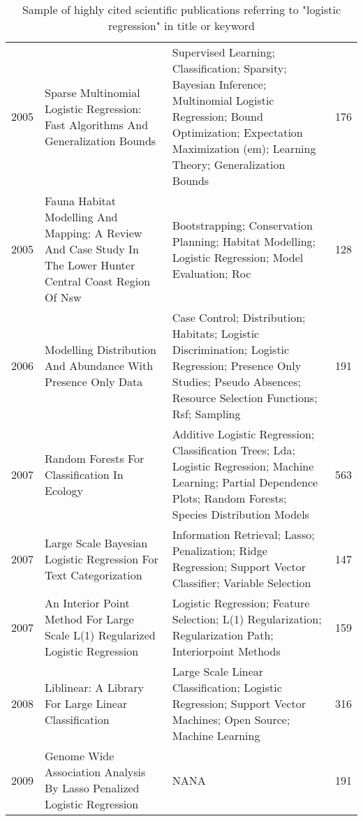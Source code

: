 \begin{table}[ht]
\begin{tabular}{p{}p{}p{}p{}}
  2005 & Sparse Multinomial Logistic Regression: Fast Algorithms And Generalization Bounds & Supervised Learning; Classification; Sparsity; Bayesian Inference; Multinomial Logistic Regression; Bound Optimization; Expectation Maximization (em); Learning Theory; Generalization Bounds & 176 \\ 
  2005 & Fauna Habitat Modelling And Mapping: A Review And Case Study In The Lower Hunter Central Coast Region Of Nsw & Bootstrapping; Conservation Planning; Habitat Modelling; Logistic Regression; Model Evaluation; Roc & 128 \\ 
  2006 & Modelling Distribution And Abundance With Presence Only Data & Case Control; Distribution; Habitats; Logistic Discrimination; Logistic Regression; Presence Only Studies; Pseudo Absences; Resource Selection Functions; Rsf; Sampling & 191 \\ 
  2007 & Random Forests For Classification In Ecology & Additive Logistic Regression; Classification Trees; Lda; Logistic Regression; Machine Learning; Partial Dependence Plots; Random Forests; Species Distribution Models & 563 \\ 
  2007 & Large Scale Bayesian Logistic Regression For Text Categorization & Information Retrieval; Lasso; Penalization; Ridge Regression; Support Vector Classifier; Variable Selection & 147 \\ 
  2007 & An Interior Point Method For Large Scale L(1) Regularized Logistic Regression & Logistic Regression; Feature Selection; L(1) Regularization; Regularization Path; Interiorpoint Methods & 159 \\ 
  2008 & Liblinear: A Library For Large Linear Classification & Large Scale Linear Classification; Logistic Regression; Support Vector Machines; Open Source; Machine Learning & 316 \\ 
  2009 & Genome Wide Association Analysis By Lasso Penalized Logistic Regression & NANA & 191 \\ 
   \hline
\end{tabular}
\endgroup
\caption{Sample of highly cited scientific publications referring to "logistic regression" in title or keyword} 
\label{tab:logistic_in_ml}
\end{table}
